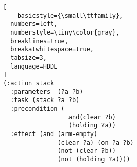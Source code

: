 \begin{lstlisting}[
    basicstyle={\small\ttfamily},
  numbers=left,
  numberstyle=\tiny\color{gray},
  breaklines=true,
  breakatwhitespace=true,
  tabsize=3,
  language=HDDL
]
(:action stack
  :parameters  (?a ?b)
  :task (stack ?a ?b)
  :precondition (
                  and(clear ?b)
                  (holding ?a))
  :effect (and (arm-empty)
               (clear ?a) (on ?a ?b)
               (not (clear ?b))
               (not (holding ?a))))
\end{lstlisting}